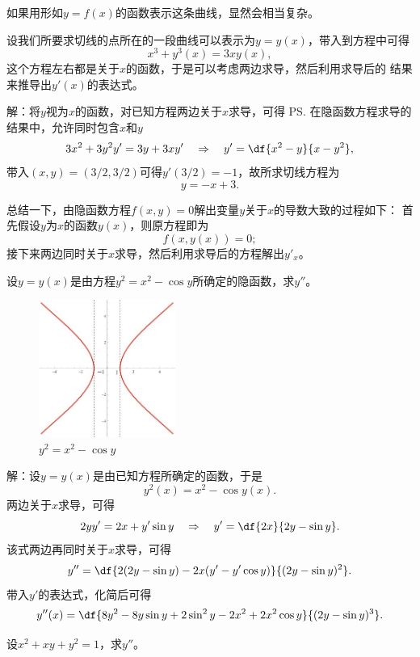 如果用形如$y=f(x)$的函数表示这条曲线，显然会相当复杂。

设我们所要求切线的点所在的一段曲线可以表示为$y=y(x)$，带入到方程中可得
$$x^3+y^3(x)=3xy(x),$$
这个方程左右都是关于$x$的函数，于是可以考虑两边求导，然后利用求导后的
结果来推导出$y'(x)$的表达式。

解：将$y$视为$x$的函数，对已知方程两边关于$x$求导，可得
\ps{在隐函数方程求导的结果中，允许同时包含$x$和$y$}
$$3x^2+3y^2y'=3y+3xy'\quad\Rightarrow\quad
y'=\df{x^2-y}{x-y^2},$$
带入$(x,y)=(3/2,3/2)$可得$y'(3/2)=-1$，故所求切线方程为
$$y=-x+3.$$
\fin

总结一下，由隐函数方程$f(x,y)=0$解出变量$y$关于$x$的导数大致的过程如下：
首先假设$y$为$x$的函数$y(x)$，则原方程即为
$$f(x,y(x))=0;$$
接下来两边同时关于$x$求导，然后利用求导后的方程解出$y'_x$。

\bs
\egz 设$y=y(x)$是由方程$y^2=x^2-\cos y$所确定的隐函数，求$y''$。

\begin{figure}[h]
	\centering
	\includegraphics[width=0.4\textwidth]
	{./Images/ch02/y2x2-cosy.jpg}
	\caption{$y^2=x^2-\cos y$}
	\label{fig:y2x2-cosy}
\end{figure}

解：设$y=y(x)$是由已知方程所确定的函数，于是
$$y^2(x)=x^2-\cos y(x).$$
两边关于$x$求导，可得
$$2yy'=2x+y'\sin y\quad\Rightarrow\quad
y'=\df{2x}{2y-\sin y}.$$
该式两边再同时关于$x$求导，可得
$$y''=\df{2(2y-\sin y)-2x(y'-y'\cos y)}{(2y-\sin y)^2}.$$
带入$y'$的表达式，化简后可得
$$y''(x)=\df{8y^2-8y\sin y+2\sin^2y-2x^2+2x^2\cos y}
{(2y-\sin y)^3}.$$
\fin

\egz 设$x^2+xy+y^2=1$，求$y''$。

